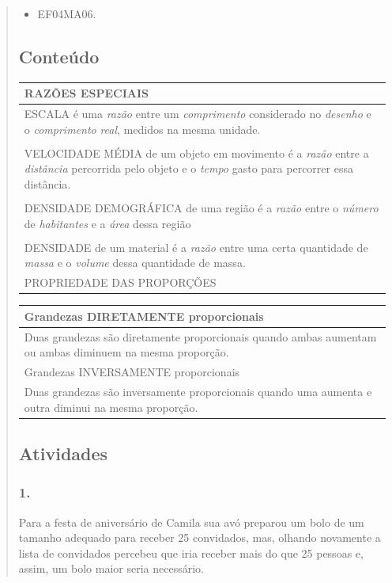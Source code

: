 \begin{enumerate}
\begin{escolha}
\begin{enumerate}
\begin{itemize}
\begin{itemize}
\begin{escolha}
\begin{quote}
\begin{escolha}
{

\begin{itemize}
\item EF04MA06.
\end{itemize}

\subsection{Conteúdo}\label{conteuxfado-9}

\begin{longtable}[]{@{}l@{}}
\toprule
RAZÕES ESPECIAIS\tabularnewline
\midrule
\endhead
ESCALA é uma \emph{razão} entre um \emph{comprimento} considerado no
\emph{desenho} e o \emph{comprimento} \emph{real}, medidos na mesma
unidade.\tabularnewline
\tabularnewline
VELOCIDADE MÉDIA de um objeto em movimento é a \emph{razão} entre a
\emph{distância} percorrida pelo objeto e o \emph{tempo} gasto para
percorrer essa distância.\tabularnewline
\tabularnewline
DENSIDADE DEMOGRÁFICA de uma região é a \emph{razão} entre o
\emph{número} de \emph{habitantes} e a \emph{área} dessa
região\tabularnewline
\tabularnewline
DENSIDADE de um material é a \emph{razão} entre uma certa quantidade de
\emph{massa} e o \emph{volume} dessa quantidade de massa.\tabularnewline
PROPRIEDADE DAS PROPORÇÕES\tabularnewline
\bottomrule
\end{longtable}

\begin{longtable}[]{@{}l@{}}
\toprule
Grandezas DIRETAMENTE proporcionais\tabularnewline
\midrule
\endhead
Duas grandezas são diretamente proporcionais quando ambas aumentam ou
ambas diminuem na mesma proporção.\tabularnewline
Grandezas INVERSAMENTE proporcionais\tabularnewline
Duas grandezas são inversamente proporcionais quando uma aumenta e outra
diminui na mesma proporção.\tabularnewline
\bottomrule
\end{longtable}

\subsection{Atividades}\label{atividades-9}

\subsubsection{1.}\label{section-117}

Para a festa de aniversário de Camila sua avó preparou um bolo de um
tamanho adequado para receber 25 convidados, mas, olhando novamente a
lista de convidados percebeu que iria receber mais do que 25 pessoas e,
assim, um bolo maior seria necessário.

}
\end{escolha}
\end{quote}
\end{escolha}
\end{itemize}
\end{itemize}
\end{enumerate}
\end{escolha}
\end{enumerate}
